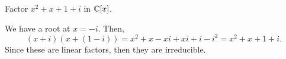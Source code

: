 \documentclass[../hw6]{subfiles}
\begin{document}
\begin{problem}
Factor $x^2 + x + 1 + i$ in $\mathbb{C}[x]$.
\end{problem}
We have a root at $x=-i$.
Then, \[
	(x+i)(x+(1-i))=x^2+x-x i+x i+i-i^2 = x^2+x+1+i
	.\]
Since these are linear factors, then they are irreducible.
\end{document}
